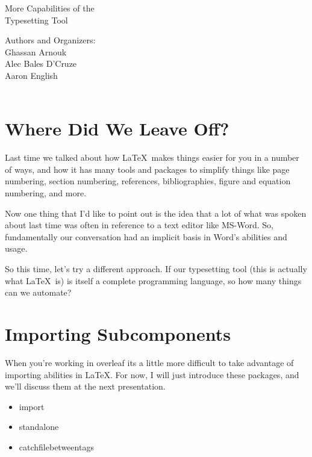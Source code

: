 \documentclass[hidelinks, float=false, crop=false]{article}
\begin{document}
{}
    \begin{center}
        \vspace*{1cm}
        {\fontsize{30}{50}\selectfont {\bfseries Hello Again \LaTeX\\}}
        \vspace{3cm}
        {\LARGE More Capabilities of the\\
            Typesetting Tool\\}
        \vspace{8cm}
    \end{center}
    \begin{flushright}
        Authors and Organizers:\\
        Ghassan Arnouk\\
        Alec Bales D'Cruze\\
        Aaron English\\
        \\
    \end{flushright}
    \thispagestyle{empty}


    \clearpage
    \tableofcontents
    \clearpage
    \section{Where Did We Leave Off?}
        Last time we talked about how \LaTeX~makes things easier for you in a number of ways, and 
        how it has many tools and packages to simplify things like page numbering, section numbering,
        references, bibliographies, figure and equation numbering, and more. 

        Now one thing that I'd like to point out is the idea that a lot of what was spoken about
        last time was often in reference to a text editor like MS-Word. So, fundamentally our 
        conversation had an implicit basis in Word's abilities and usage. 

        So this time, let's try a different approach. If our typesetting tool (this is actually what
        \LaTeX~is) is itself a complete programming language, so how many things can we automate?

    \section{Importing Subcomponents}
        When you're working in overleaf its a little more difficult to take advantage of importing abilities in \LaTeX.
        For now, I will just introduce these packages, and we'll discuss them at the next presentation.
        \begin{itemize}
            \item import
            \item standalone
            \item catchfilebetweentags
        \end{itemize}
\end{document}
